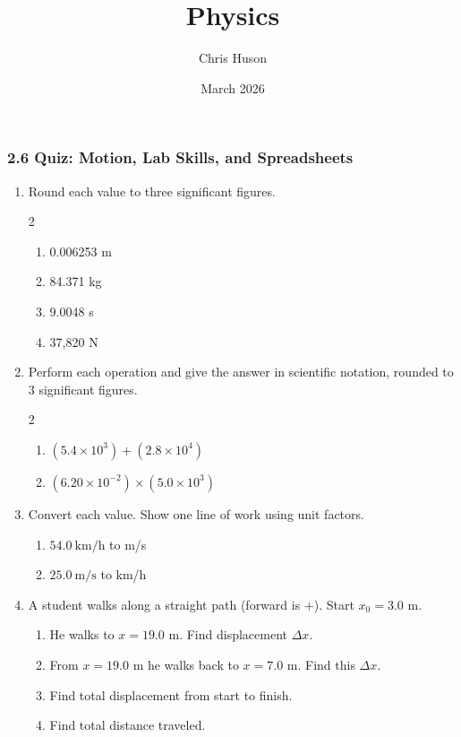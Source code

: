 \documentclass[12pt, twoside]{article}
\title{Physics}
\author{Chris Huson}
\date{March 2026}
\begin{document}
\subsubsection*{2.6 Quiz: Motion, Lab Skills, and Spreadsheets}

\begin{enumerate}[itemsep=0.5cm]

\item Round each value to three significant figures.
  \begin{multicols}{2}
  \begin{enumerate}[itemsep=0.5cm]
    \item 0.006253 m
    \item 84.371 kg
    \item 9.0048 s
    \item 37,820 N
  \end{enumerate}
  \end{multicols}
  \vspace{0.5cm}

\item Perform each operation and give the answer in scientific notation, rounded to 3 significant figures.
  \begin{multicols}{2}
  \begin{enumerate}[itemsep=1cm]
    \item $(5.4\times10^{3}) + (2.8\times10^{4})$
    \item $(6.20\times10^{-2}) \times (5.0\times10^{3})$
  \end{enumerate}
  \end{multicols}
  \vspace{0.5cm}

\item Convert each value. Show one line of work using unit factors.
  \begin{enumerate}[itemsep=1.5cm]
    \item $54.0~\text{km/h}$ to m/s
    \item $25.0~\text{m/s}$ to km/h
  \end{enumerate}
  \vspace{0.75cm}

\item A student walks along a straight path (forward is $+$). Start $x_0 = 3.0$ m.
  \begin{enumerate}[itemsep=1cm]
    \item He walks to $x = 19.0$ m. Find displacement $\Delta x$.
    \item From $x=19.0$ m he walks back to $x=7.0$ m. Find this $\Delta x$.
    \item Find total displacement from start to finish.
    \item Find total distance traveled.
  \end{enumerate}


\end{enumerate}
\end{document}
